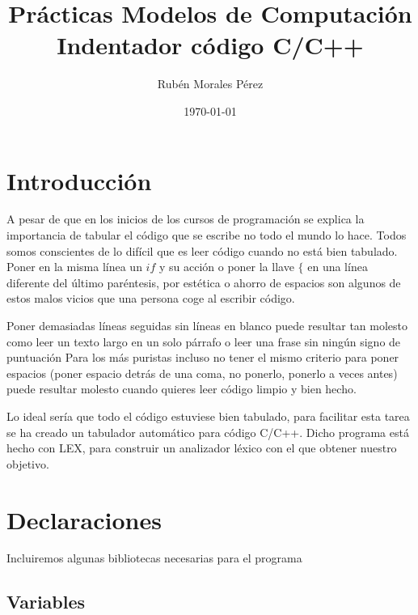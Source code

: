 \documentclass[11pt,spanish]{article} %
\title{Prácticas Modelos de Computación\\Indentador código C/C++}
\author{Rubén Morales Pérez}
\date{\today}
\begin{document}
\maketitle
\setlength\parindent{0pt} %

\section{Introducción}
A pesar de que en los inicios de los cursos de programación se explica la importancia de tabular el código que se escribe no todo el mundo lo hace. 
Todos somos conscientes de lo difícil que es leer código cuando no está bien tabulado.
Poner en la misma línea un $if$ y su acción o poner la llave $\{$ en una línea diferente del último paréntesis, por estética o ahorro de espacios son algunos de estos malos vicios que una persona coge al escribir código.

Poner demasiadas líneas seguidas sin líneas en blanco puede resultar tan molesto como leer un texto largo en un solo párrafo o leer una frase sin ningún signo de puntuación
Para los más puristas incluso no tener el mismo criterio para poner espacios (poner espacio detrás de una coma, no ponerlo, ponerlo a veces antes) puede resultar molesto cuando quieres leer código limpio y bien hecho.

Lo ideal sería que todo el código estuviese bien tabulado, para facilitar esta tarea se ha creado un tabulador automático para código C/C++. Dicho programa está hecho con LEX, para construir un analizador léxico con el que obtener nuestro objetivo.

\section{Declaraciones}
Incluiremos algunas bibliotecas necesarias para el programa


\subsection{Variables}

\end{document}
